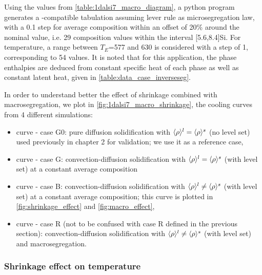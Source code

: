 Using the values from \cref{table:1dalsi7_macro_diagram}, a python program generates a \cimlib-compatible tabulation assuming lever rule as microsegregation law, 
with a \SI{0.1}{\ucomposition} step for average composition within an offset of 20\% around the nominal value, i.e.
29 composition values within the interval [5.6,8.4]\si{\ucomposition}Si.
For temperature, a range between $T_E$=\SI{577}{\udegC} and \SI{630}{\udegC} is considered with a step of \SI{1}{\udegC}, corresponding to 54 values. 
It is noted that for this application, the phase enthalpies are deduced from constant 
specific heat of each phase as well as constant latent heat, given in \cref{table:data_case_inverseseg}.

In order to understand better the effect of shrinkage combined with macrosegregation, we plot in \cref{fig:1dalsi7_macro_shrinkage},
the cooling curves from 4 different simulations: 
\begin{itemize}
\itemsep0em
\item {} curve - case G0: pure diffusion solidification with $\langle \rho \rangle^l=\langle \rho \rangle^s$ (no level set) used previously in chapter 2 for validation;
we use it as a reference case,
\item {} curve - case G: convection-diffusion solidification with $\langle \rho \rangle^l=\langle \rho \rangle^s$ (with level set) at a constant average composition
\item {} curve - case B: convection-diffusion solidification with $\langle \rho \rangle^l \neq \langle \rho \rangle^s$ (with level set) at a constant average composition; this curve is plotted in 
\cref{fig:shrinkage_effect} and \cref{fig:macro_effect},
\item {} curve - case R (not to be confused with case R defined in the previous section): 
convection-diffusion solidification with $\langle \rho \rangle^l \neq \langle \rho \rangle^s$ (with level set) and macrosegregation.
\end{itemize}

\subsubsection{Shrinkage effect on temperature}

